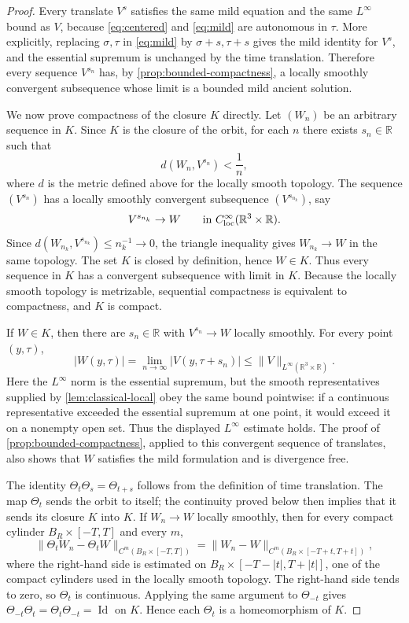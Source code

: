 \documentclass[11pt]{amsart}
\theoremstyle{plain}
\theoremstyle{definition}
\theoremstyle{remark}
\numberwithin{equation}{section}
\begin{document}
\begin{proof}
Every translate \(V^s\) satisfies the same mild equation and the same
\(L^\infty\) bound as \(V\), because \eqref{eq:centered} and
\eqref{eq:mild} are autonomous in \(\tau\).  More explicitly, replacing
\(\sigma,\tau\) in \eqref{eq:mild} by \(\sigma+s,\tau+s\) gives the mild
identity for \(V^s\), and the essential supremum is unchanged by the time
translation.  Therefore every sequence \(V^{s_n}\) has, by
\cref{prop:bounded-compactness}, a locally smoothly convergent subsequence
whose limit is a bounded mild ancient solution.

We now prove compactness of the closure \(K\) directly.  Let \((W_n)\) be an
arbitrary sequence in \(K\).  Since \(K\) is the closure of the orbit, for
each \(n\) there exists \(s_n\in\mathbb R\) such that
\[
   d(W_n,V^{s_n})<\frac1n,
\]
where \(d\) is the metric defined above for the locally smooth topology.  The
sequence \((V^{s_n})\) has a locally smoothly convergent subsequence
\((V^{s_{n_k}})\), say
\[
   V^{s_{n_k}}\to W
   \qquad\hbox{in }C^\infty_{\mathrm{loc}}(\mathbb R^3\times\mathbb R).
\]
Since \(d(W_{n_k},V^{s_{n_k}})\le n_k^{-1}\to0\), the triangle inequality
gives \(W_{n_k}\to W\) in the same topology.  The set \(K\) is closed by
definition, hence \(W\in K\).  Thus every sequence in \(K\) has a convergent
subsequence with limit in \(K\).  Because the locally smooth topology is
metrizable, sequential compactness is equivalent to compactness, and \(K\) is
compact.

If \(W\in K\), then there are \(s_n\in\mathbb R\) with \(V^{s_n}\to W\)
locally smoothly.  For every point \((y,\tau)\),
\[
   |W(y,\tau)|
   =
   \lim_{n\to\infty}|V(y,\tau+s_n)|
   \le
   \|V\|_{L^\infty(\mathbb R^3\times\mathbb R)}.
\]
Here the \(L^\infty\) norm is the essential supremum, but the smooth
representatives supplied by \cref{lem:classical-local} obey the same bound
pointwise: if a continuous representative exceeded the essential supremum at
one point, it would exceed it on a nonempty open set.  Thus the displayed
\(L^\infty\) estimate holds.  The proof of
\cref{prop:bounded-compactness}, applied to this convergent sequence of
translates, also shows that \(W\) satisfies the mild formulation and is
divergence free.

The identity \(\Theta_t\Theta_s=\Theta_{t+s}\) follows from the definition of
time translation.  The map \(\Theta_t\) sends the orbit to itself; the
continuity proved below then implies that it sends its closure \(K\) into
\(K\).  If \(W_n\to W\) locally smoothly, then for every compact
cylinder \(B_R\times[-T,T]\) and every \(m\),
\[
   \|\Theta_tW_n-\Theta_tW\|_{C^m(B_R\times[-T,T])}
   =
   \|W_n-W\|_{C^m(B_R\times[-T+t,T+t])},
\]
where the right-hand side is estimated on \(B_R\times[-T-|t|,T+|t|]\), one of
the compact cylinders used in the locally smooth topology.  The right-hand
side tends to zero, so \(\Theta_t\) is
continuous.  Applying the same argument to \(\Theta_{-t}\) gives
\(\Theta_{-t}\Theta_t=\Theta_t\Theta_{-t}=\operatorname{Id}\) on \(K\).  Hence
each \(\Theta_t\) is a homeomorphism of \(K\).


\end{proof}
\end{document}
